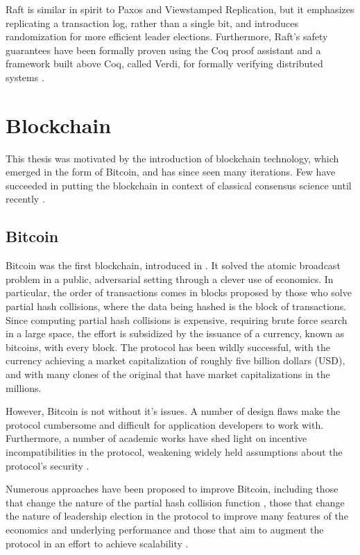 Raft is similar in spirit to Paxos and Viewstamped Replication, but it emphasizes replicating a transaction log, 
rather than a single bit, and introduces randomization for more efficient leader elections.
Furthermore, Raft's safety guarantees have been formally proven using the Coq proof assistant \cite{woos2016planning}
and a framework built above Coq, called Verdi, for formally verifying distributed systems \cite{wilcox2015verdi}.

\section{Blockchain}

This thesis was motivated by the introduction of blockchain technology, which emerged in the form of Bitcoin,
and has since seen many iterations.
Few have succeeded in putting the blockchain in context of classical consensus science until recently \cite{vukolic11quest,cachin2016non,honeybadger}.

\subsection{Bitcoin} 

Bitcoin was the first blockchain, introduced in \cite{bitcoin}.
It solved the atomic broadcast problem in a public, adversarial setting through a clever use of economics.
In particular, the order of transactions comes in blocks proposed by those who solve partial hash collisions,
where the data being hashed is the block of transactions.
Since computing partial hash collisions is expensive, requiring brute force search in a large space,
the effort is subsidized by the issuance of a currency, known as bitcoins, with every block.
The protocol has been wildly successful, with the currency achieving a market capitalization
of roughly five billion dollars (USD), and with many clones of the original that have market capitalizations in the millions.

However, Bitcoin is not without it's issues. A number of design flaws make the protocol cumbersome and difficult 
for application developers to work with.
Furthermore, a number of academic works have shed light on incentive incompatibilities in the protocol,
weakening widely held assumptions about the protocol's security \cite{eyal2014majority,courtois2014subversive}.

Numerous approaches have been proposed to improve Bitcoin,
including those that change the nature of the partial hash collision function \cite{miller2015nonoutsourceable},
those that change the nature of leadership election in the protocol to improve many features of the economics and underlying performance \cite{eyal2015bitcoin}
and those that aim to augment the protocol in an effort to achieve scalability \cite{sidechains,poon2015bitcoin}.

